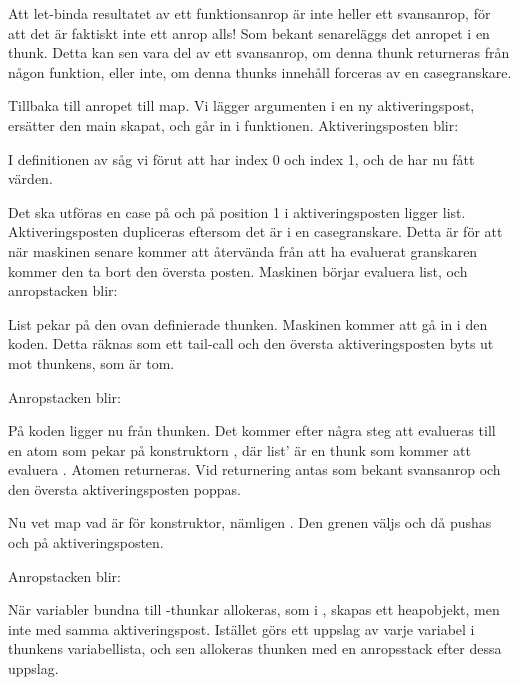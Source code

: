 \documentclass[../Core]{subfiles}
\begin{document}
Att let-binda resultatet av ett
funktionsanrop är inte heller ett svansanrop, för att det är faktiskt inte ett
anrop alls! Som bekant senareläggs det anropet i en thunk. Detta kan sen vara
del av ett svansanrop, om denna thunk returneras från någon funktion, eller inte,
om denna thunks innehåll forceras av en casegranskare.

Tillbaka till anropet till map. 
Vi lägger argumenten i en ny aktiveringspost, ersätter den main skapat,
och går in i funktionen. 
Aktiveringsposten blir:
\begin{codeEx}
\end{codeEx}
I definitionen av  såg vi förut att  har index 0 och
 index 1, och de har nu fått värden.

Det ska utföras en case på  och på position 1 i
aktiveringsposten ligger list. Aktiveringsposten dupliceras eftersom
det är i en casegranskare. Detta är för att när maskinen senare kommer
att återvända från att ha evaluerat granskaren kommer den ta bort den 
översta posten. Maskinen börjar evaluera list, och anropstacken blir:
\begin{codeEx}
\end{codeEx}

List pekar på den ovan definierade thunken. Maskinen kommer att gå in i den
koden. Detta räknas som ett tail-call och den översta aktiveringsposten byts
ut mot thunkens, som är tom.

Anropstacken blir:
\begin{codeEx}
\end{codeEx}

På koden ligger nu  från thunken. 
Det kommer efter några steg att evalueras till en atom 
som pekar på 
konstruktorn , där list' är
en thunk som kommer att evaluera . 
Atomen
returneras. Vid returnering antas som bekant svansanrop och 
den översta aktiveringsposten poppas.


Nu vet map vad  är för konstruktor, nämligen
. Den grenen väljs och då pushas  och 
 på aktiveringsposten. 

Anropstacken blir:
\begin{codeEx}
\end{codeEx}

När variabler bundna till -thunkar allokeras, som 
i , skapas ett heapobjekt, men inte med samma aktiveringspost.
Istället görs ett uppslag av varje variabel i thunkens variabellista, och
sen allokeras thunken med en anropsstack efter dessa uppslag. 
\end{document}
